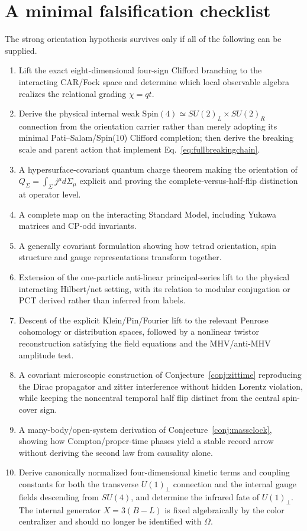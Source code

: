 \documentclass[11pt]{article}
\theoremstyle{definition}\newtheorem{definition}[theorem]{Definition}
\theoremstyle{remark}\newtheorem{remark}[theorem]{Remark}\newtheorem{conjecture}[theorem]{Conjecture}
\begin{document}
\section{A minimal falsification checklist}\label{app:falsify}
The strong orientation hypothesis survives only if all of the following can be supplied.
\begin{enumerate}[label=(F\arabic*)]
\item Lift the exact eight-dimensional four-sign Clifford branching to the interacting CAR/Fock space and determine which local observable algebra realizes the relational grading $\chi=qt$.
\item Derive the physical internal weak $\mathrm{Spin}(4)\simeq SU(2)_L\times SU(2)_R$ connection from the orientation carrier rather than merely adopting its minimal Pati--Salam/Spin(10) Clifford completion; then derive the breaking scale and parent action that implement Eq.~\eqref{eq:fullbreakingchain}.
\item A hypersurface-covariant quantum charge theorem making the orientation of $Q_\Sigma=\int_\Sigma j^\mu d\Sigma_\mu$ explicit and proving the complete-versus-half-flip distinction at operator level.
\item A complete map on the interacting Standard Model, including Yukawa matrices and CP-odd invariants.
\item A generally covariant formulation showing how tetrad orientation, spin structure and gauge representations transform together.
\item Extension of the one-particle anti-linear principal-series lift to the physical interacting Hilbert/net setting, with its relation to modular conjugation or PCT derived rather than inferred from labels.
\item Descent of the explicit Klein/Pin/Fourier lift to the relevant Penrose cohomology or distribution spaces, followed by a nonlinear twistor reconstruction satisfying the field equations and the MHV/anti-MHV amplitude test.
\item A covariant microscopic construction of Conjecture~\ref{conj:zittime} reproducing the Dirac propagator and zitter interference without hidden Lorentz violation, while keeping the noncentral temporal half flip distinct from the central spin-cover sign.
\item A many-body/open-system derivation of Conjecture~\ref{conj:massclock}, showing how Compton/proper-time phases yield a stable record arrow without deriving the second law from causality alone.
\item Derive canonically normalized four-dimensional kinetic terms and coupling constants for both the transverse $U(1)_\perp$ connection and the internal gauge fields descending from $SU(4)$, and determine the infrared fate of $U(1)_\perp$. The internal generator $X=3(B-L)$ is fixed algebraically by the color centralizer and should no longer be identified with $\Omega$.

\end{enumerate}
\end{document}
